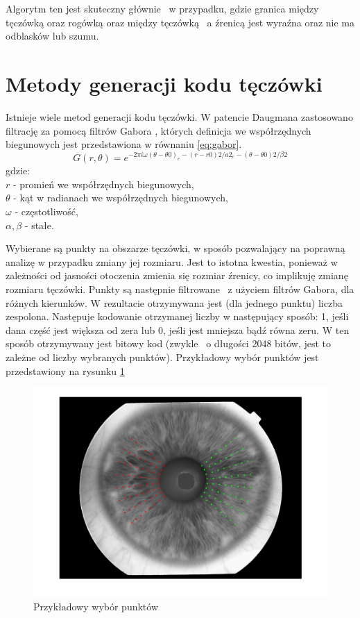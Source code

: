Algorytm ten jest skuteczny głównie ~w przypadku, gdzie granica między tęczówką oraz rogówką oraz między tęczówką ~a źrenicą jest wyraźna oraz nie ma odblasków lub szumu.

\section{Metody generacji kodu tęczówki}
\label{sec:metodyGeneracjiKodu}

Istnieje wiele metod generacji kodu tęczówki. W patencie Daugmana zastosowano filtrację za pomocą filtrów Gabora \cite{Daugman}, których definicja we współrzędnych biegunowych jest przedstawiona w równaniu \ref{eq:gabor}.
\begin{equation}
\label{eq:gabor}
G(r,\theta) = e^{-2\pi i\omega (\theta - \theta 0)_{e}-(r - r0)2/a2_{e}-(\theta-\theta 0 )2/\beta 2}
\end{equation}
gdzie:\\
$r$ - promień we współrzędnych biegunowych, \\
$\theta$ - kąt w radianach we współrzędnych biegunowych, \\
$ \omega $ - częstotliwość, \\
$ \alpha, \beta $ - stałe.


Wybierane są punkty na obszarze tęczówki, w sposób pozwalający na poprawną analizę w przypadku zmiany jej rozmiaru. Jest to istotna kwestia, ponieważ w zależności od jasności otoczenia zmienia się rozmiar źrenicy, co implikuję zmianę rozmiaru tęczówki. Punkty są następnie filtrowane ~z użyciem filtrów Gabora, dla różnych kierunków. W rezultacie otrzymywana jest (dla jednego punktu) liczba zespolona. Następuje kodowanie otrzymanej liczby w następujący sposób: 1, jeśli dana część jest większa od zera lub 0, jeśli jest mniejsza bądź równa zeru. W ten sposób otrzymywany jest bitowy kod (zwykle ~o długości 2048 bitów, jest to zależne od liczby wybranych punktów). Przykładowy wybór punktów jest przedstawiony na rysunku \ref{fig:przykladPunkty}

\begin{figure}
\begin{center}
\includegraphics[scale=0.5]{punkty.png}
\caption{Przykładowy wybór punktów}
\label{fig:przykladPunkty}
\end{center}
\end{figure}

